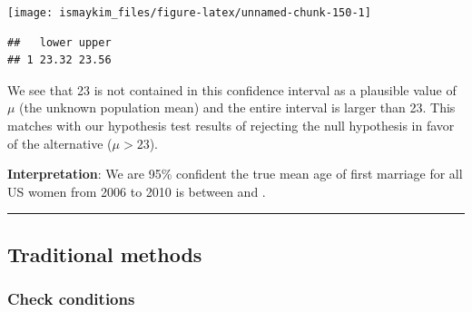 \documentclass[]{tufte-book}
\newenvironment{Shaded}{\begin{snugshade}}{\end{snugshade}}
\newcommand{\KeywordTok}[1]{\textcolor[rgb]{0.13,0.29,0.53}{\textbf{{#1}}}}
\newcommand{\DataTypeTok}[1]{\textcolor[rgb]{0.13,0.29,0.53}{{#1}}}
\newcommand{\DecValTok}[1]{\textcolor[rgb]{0.00,0.00,0.81}{{#1}}}
\newcommand{\FloatTok}[1]{\textcolor[rgb]{0.00,0.00,0.81}{{#1}}}
\newcommand{\StringTok}[1]{\textcolor[rgb]{0.31,0.60,0.02}{{#1}}}
\newcommand{\NormalTok}[1]{{#1}}
\let\oldrule=\rule
\renewcommand{\rule}[1]{\oldrule{\linewidth}}
\begin{document}
\begin{Shaded}
\end{Shaded}

\begin{center}\texttt{[image: ismaykim\_files/figure-latex/unnamed-chunk-150-1]} \end{center}

\begin{Shaded}
\end{Shaded}

\begin{verbatim}
##   lower upper
## 1 23.32 23.56
\end{verbatim}

We see that 23 is not contained in this confidence interval as a
plausible value of \(\mu\) (the unknown population mean) and the entire
interval is larger than 23. This matches with our hypothesis test
results of rejecting the null hypothesis in favor of the alternative
(\(\mu > 23\)).

\textbf{Interpretation}: We are 95\% confident the true mean age of
first marriage for all US women from 2006 to 2010 is between and .

\begin{center}\rule{0.5\linewidth}{\linethickness}\end{center}

\subsection{Traditional methods}\label{traditional-methods}

\subsubsection{Check conditions}\label{check-conditions}
\end{document}
